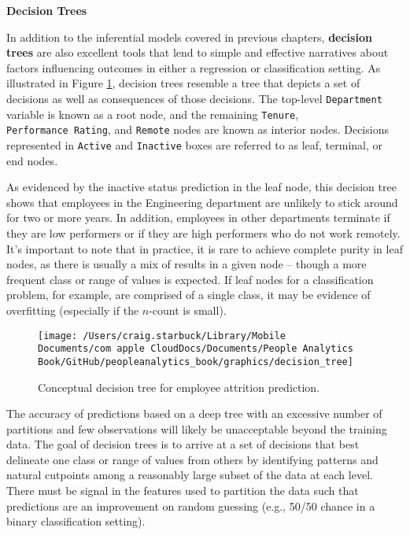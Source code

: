 \documentclass[
]{book}
\begin{document}
\textbf{Decision Trees}

In addition to the inferential models covered in previous chapters, \textbf{decision trees} are also excellent tools that lend to simple and effective narratives about factors influencing outcomes in either a regression or classification setting. As illustrated in Figure \ref{fig:decision-tree}, decision trees resemble a tree that depicts a set of decisions as well as consequences of those decisions. The top-level \texttt{Department} variable is known as a root node, and the remaining \texttt{Tenure}, \texttt{Performance\ Rating}, and \texttt{Remote} nodes are known as interior nodes. Decisions represented in \texttt{Active} and \texttt{Inactive} boxes are referred to as leaf, terminal, or end nodes.

As evidenced by the inactive status prediction in the leaf node, this decision tree shows that employees in the Engineering department are unlikely to stick around for two or more years. In addition, employees in other departments terminate if they are low performers or if they are high performers who do not work remotely. It's important to note that in practice, it is rare to achieve complete purity in leaf nodes, as there is usually a mix of results in a given node -- though a more frequent class or range of values is expected. If leaf nodes for a classification problem, for example, are comprised of a single class, it may be evidence of overfitting (especially if the \(n\)-count is small).

\begin{figure}

{\centering \texttt{[image: /Users/craig.starbuck/Library/Mobile Documents/com~apple~CloudDocs/Documents/People Analytics Book/GitHub/peopleanalytics\_book/graphics/decision\_tree]} 

}

\caption{Conceptual decision tree for employee attrition prediction.}\label{fig:decision-tree}
\end{figure}

The accuracy of predictions based on a deep tree with an excessive number of partitions and few observations will likely be unacceptable beyond the training data. The goal of decision trees is to arrive at a set of decisions that best delineate one class or range of values from others by identifying patterns and natural cutpoints among a reasonably large subset of the data at each level. There must be signal in the features used to partition the data such that predictions are an improvement on random guessing (e.g., 50/50 chance in a binary classification setting).
\end{document}
